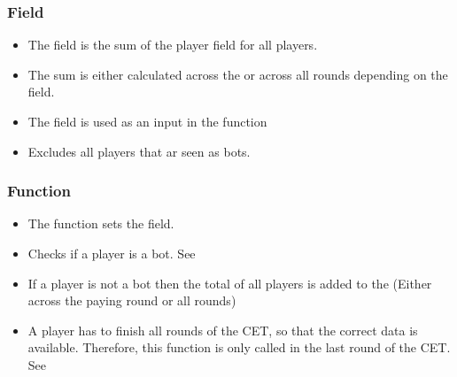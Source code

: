 \documentclass[letterpaper,10pt,english]{sphinxmanual}
\begin{document}
\subsubsection{Field}
\label{\detokenize{Subsession_fields:field}}\begin{itemize}
\item {} 
The  field is the sum of the  player field for all players.

\item {} 
The sum is either calculated across the  or across all rounds depending on the {\hyperref[\detokenize{Constants:random-emission}]{}} field.

\item {} 
The field is used as an input in the  function

\item {} 
Excludes all players that ar seen as bots.

\end{itemize}


\subsubsection{Function}
\label{\detokenize{Subsession_fields:function}}\begin{itemize}
\item {} 
The  function sets the  field.

\item {} 
Checks if a player is a bot. See {\hyperref[\detokenize{Constants:bot-criteria-ref}]{}}

\item {} 
If a player is not a bot then the total  of all players is added to the  (Either across the paying round or all rounds)

\item {} 
A player has to finish all rounds of the CET, so that the correct data is available. Therefore, this function is only called in the last round of the CET. See {\hyperref[\detokenize{pages:exp-page}]{}}

\end{itemize}
\end{document}
